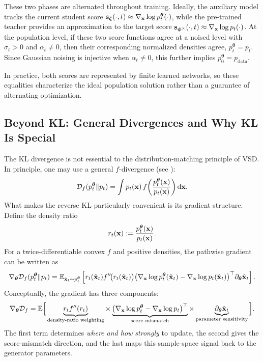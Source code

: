 These two phases are alternated throughout training. Ideally, the auxiliary
model tracks the current student score
${\mathbf{s}}_{\bm{\zeta}}(\cdot,t)\approx\nabla_{{\mathbf{x}}}\log p_t^{\bm{\theta}}(\cdot)$,
while the pre-trained teacher provides an approximation to the target score
${\mathbf{s}}_{\bm{\phi}^\times}(\cdot,t)\approx\nabla_{{\mathbf{x}}}\log p_t(\cdot)$.
At the population level, if these two score functions agree at a noised level
with $\sigma_t>0$ and $\alpha_t\neq 0$, then their corresponding normalized
densities agree, $p_t^{\bm{\theta}}=p_t$. Since Gaussian noising is injective
when $\alpha_t\neq 0$, this further implies
$p_0^{\bm{\theta}}=p_{\mathrm{data}}$.

In practice, both scores are represented by finite learned networks, so these
equalities characterize the ideal population solution rather than a guarantee
of alternating optimization.


\subsection{Beyond KL: General Divergences and Why KL Is Special}
\label{subsec:vsd-discussion}

The KL divergence is not essential to the distribution-matching principle of VSD.
In principle, one may use a general $f$-divergence (see ):
\[
\mathcal{D}_f(p_t^{{\bm{\theta}}}\|p_t)
=
\int p_t({\mathbf{x}})\,
f\!\left(
\frac{p_t^{{\bm{\theta}}}({\mathbf{x}})}{p_t({\mathbf{x}})}
\right)\mathop{}\!\mathrm{d} {\mathbf{x}}.
\]
What makes the reverse KL particularly convenient is its gradient structure.
Define the density ratio
\[
r_t({\mathbf{x}})
:=
\frac{p_t^{{\bm{\theta}}}({\mathbf{x}})}{p_t({\mathbf{x}})}.
\]
For a twice-differentiable convex $f$ and positive densities, the pathwise
gradient can be written as
\[
\nabla_{{\bm{\theta}}}\mathcal{D}_f(p_t^{{\bm{\theta}}}\|p_t)
=
\mathbb{E}_{\hat{{\mathbf{x}}}_t\sim p_t^{{\bm{\theta}}}}
\left[
r_t(\hat{{\mathbf{x}}}_t)f''\!\big(r_t(\hat{{\mathbf{x}}}_t)\big)
\big(
\nabla_{{\mathbf{x}}}\log p_t^{{\bm{\theta}}}(\hat{{\mathbf{x}}}_t)
-
\nabla_{{\mathbf{x}}}\log p_t(\hat{{\mathbf{x}}}_t)
\big)^\top
\partial_{{\bm{\theta}}}\hat{{\mathbf{x}}}_t
\right].
\]
Conceptually, the gradient has three components:
\[
\begin{aligned}
\nabla_{{\bm{\theta}}}\mathcal{D}_f
=
\mathbb{E}\Big[
\underbrace{r_t f''(r_t)}_{\text{density-ratio weighting}}
\times
\underbrace{
\big(
\nabla_{{\mathbf{x}}}\log p_t^{{\bm{\theta}}}
-
\nabla_{{\mathbf{x}}}\log p_t
\big)^\top
}_{\text{score mismatch}}
\times
\underbrace{
\partial_{{\bm{\theta}}}\hat{{\mathbf{x}}}_t
}_{\text{parameter sensitivity}}
\Big].
\end{aligned}
\]
The first term determines \emph{where and how strongly} to update, the second
gives the score-mismatch direction, and the last maps this sample-space
signal back to the generator parameters.

